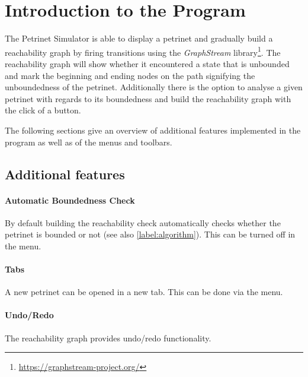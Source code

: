 \documentclass[10pt, a4paper]{article}
\begin{document}
 

\thispagestyle{empty}
\newpage 

\tableofcontents \thispagestyle{plain} \newpage


 \rmfamily \onehalfspace 

\section{Introduction to the Program}

The Petrinet Simulator is able to display a petrinet and gradually build a reachability graph by firing transitions using the \textit{GraphStream} library\footnote{\url{https://graphstream-project.org/}}. The reachability graph will show whether it encountered a state that is unbounded and mark the beginning and ending nodes on the path signifying the unboundedness of the petrinet. Additionally there is the option to analyse a given petrinet with regards to its boundedness and build the reachability graph with the click of a button.

The following sections give an overview of additional features implemented in the program as well as of the menus and toolbars.

\subsection{Additional features}

\paragraph{Automatic Boundedness Check} By default building the reachability check automatically checks whether the petrinet is bounded or not (see also \ref{label:algorithm}). This can be turned off in the menu.

\paragraph{Tabs} A new petrinet can be opened in a new tab. This can be done via the menu.

\paragraph{Undo/Redo} The reachability graph provides undo/redo functionality.
\end{document}
